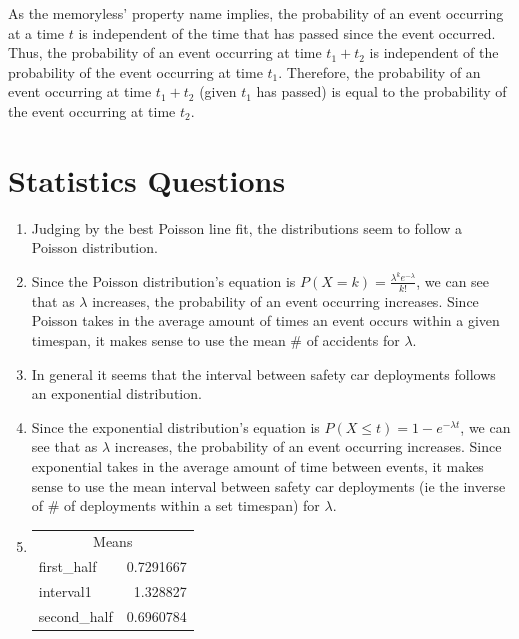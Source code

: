 \documentclass{article}
\begin{document}
\begin{enumerate}
          As the memoryless' property name implies, the probability of an event occurring at a time \(t\) is independent of the time that has passed since the event occurred. Thus, the probability of an event occurring at time \(t_1 + t_2\) is independent of the probability of the event occurring at time \(t_1\). Therefore, the probability of an event occurring at time \(t_1 + t_2\) (given \(t_1\) has passed) is equal to the probability of the event occurring at time \(t_2\).
\end{enumerate}

\pagebreak

\section*{Statistics Questions}
\begin{enumerate}
    \item Judging by the best Poisson line fit, the distributions seem to follow a Poisson distribution.
    \item Since the Poisson distribution's equation is \(P(X = k) = \frac{\lambda^k e^{-\lambda}}{k!}\), we can see that as \(\lambda\) increases, the probability of an event occurring increases. Since Poisson takes in the average amount of times an event occurs within a given timespan, it makes sense to use the mean \# of accidents for \(\lambda\).
    \item In general it seems that the interval between safety car deployments follows an exponential distribution.
    \item Since the exponential distribution's equation is \(P(X \leq t) = 1 - e^{-\lambda t}\), we can see that as \(\lambda\) increases, the probability of an event occurring increases. Since exponential takes in the average amount of time between events, it makes sense to use the mean interval between safety car deployments (ie the inverse of \# of deployments within a set timespan) for \(\lambda\).
    \item
          \setlength{\columnsep}{-5.5cm}
          \begin{multicols}{2}
              \begin{tabular}{lr|}
                  \multicolumn{2}{c}{Means} \\
                  first\_half  & 0.7291667  \\
                  interval1    & 1.328827   \\
                  second\_half & 0.6960784  \\

\end{tabular}
\end{multicols}
\end{enumerate}
\end{document}
